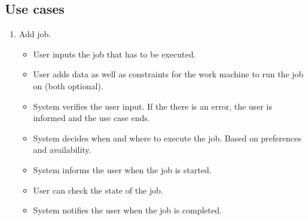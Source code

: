 \subsection{Use cases}
\begin{enumerate}
  \item Add job.
  \begin{itemize}
    \item User inputs the job that has to be executed.
    \item User adds data as well as constraints for the work machine to run the job on (both optional).
    \item System verifies the user input.
    If the there is an error, the user is informed and the use case ends.
    \item System decides when and where to execute the job.
    Based on preferences and availability.
    \item System informs the user when the job is started.
    \item User can check the state of the job.
    \item System notifies the user when the job is completed.
  \end{itemize}
\end{enumerate}
